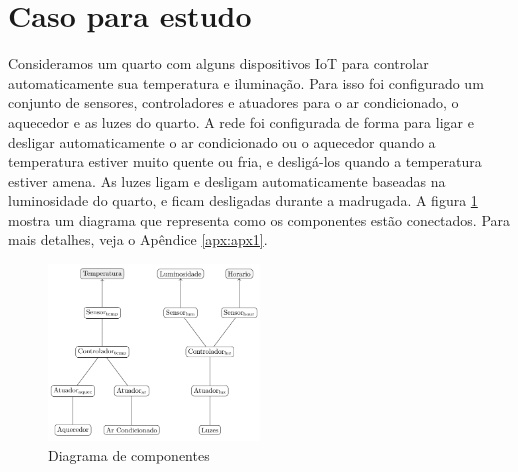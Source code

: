 \section{Caso para estudo} \label{sec:chap4}

Consideramos um quarto com alguns dispositivos IoT para controlar automaticamente sua temperatura e iluminação. Para isso foi configurado um conjunto de sensores, controladores e atuadores para o ar condicionado, o aquecedor e as luzes do quarto.
A rede foi configurada de forma para ligar e desligar automaticamente o ar condicionado ou o aquecedor quando a temperatura estiver muito quente ou fria, e desligá-los quando a temperatura estiver amena. As luzes ligam e desligam automaticamente baseadas na luminosidade do quarto, e ficam desligadas durante a madrugada.
A figura \ref{fig:fig2} mostra um diagrama que representa como os componentes estão conectados.
Para mais detalhes, veja o Apêndice \ref{apx:apx1}.

\begin{figure}[ht]
  \centering
  \includegraphics[width=0.5\textwidth]{img/network-diagram.png}
  \caption{Diagrama de componentes}
  \label{fig:fig2}
\end{figure}